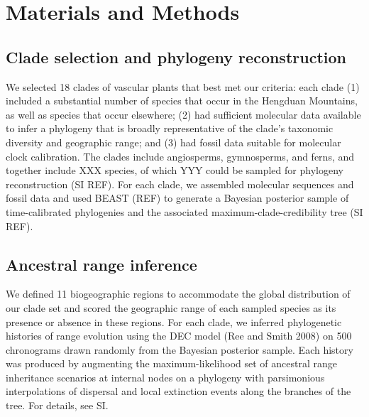\section{Materials and Methods}

\subsection{Clade selection and phylogeny reconstruction}

We selected 18 clades of vascular plants that best met our criteria: each clade (1) included a substantial number of species that occur in the Hengduan Mountains, as well as species that occur elsewhere; (2) had sufficient molecular data available to infer a phylogeny that is broadly representative of the clade's taxonomic diversity and geographic range; and (3) had fossil data suitable for molecular clock calibration. The clades include angiosperms, gymnosperms, and ferns, and together include XXX species, of which YYY could be sampled for phylogeny reconstruction (SI REF). For each clade, we assembled molecular sequences and fossil data and used BEAST (REF) to generate a Bayesian posterior sample of time-calibrated phylogenies and the associated maximum-clade-credibility tree (SI REF).

\subsection{Ancestral range inference}

We defined 11 biogeographic regions to accommodate the global distribution of our clade set and scored the geographic range of each sampled species as its presence or absence in these regions. For each clade, we inferred phylogenetic histories of range evolution using the DEC model (Ree and Smith 2008) on 500 chronograms drawn randomly from the Bayesian posterior sample. Each history was produced by augmenting the maximum-likelihood set of ancestral range inheritance scenarios at internal nodes on a phylogeny with parsimonious interpolations of dispersal and local extinction events along the branches of the tree. For details, see SI.